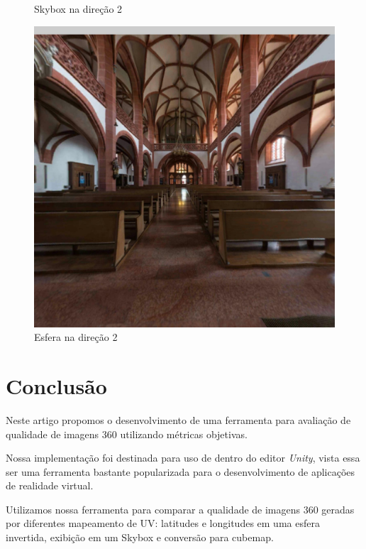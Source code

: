\documentclass[conference]{IEEEtran}
\begin{document}
\begin{figure}[!tbp]
\begin{minipage}[b]{0.3\textwidth}
    \caption{Skybox na direção 2}
    \label{fig:equisphere}
  \end{minipage}
  \hfill
  \begin{minipage}[b]{0.3\textwidth}
    \centering
    \includegraphics[width=1.1\textwidth]{../images/screenshots/Screenshot_5_Sphere}
    \caption{Esfera na direção 2}
    \label{fig:equisphere}
  \end{minipage}
\end{figure}

\section{Conclusão}  \label{sec:conclusion}

Neste artigo propomos o desenvolvimento de uma ferramenta para avaliação de qualidade de imagens 360 utilizando métricas objetivas.

Nossa implementação foi destinada para uso de dentro do editor \textit{Unity}, vista essa ser uma ferramenta bastante popularizada para o desenvolvimento de aplicações de realidade virtual.

Utilizamos nossa ferramenta para comparar a qualidade de imagens 360 geradas por diferentes mapeamento de UV: latitudes e longitudes em uma esfera invertida, exibição em um Skybox e conversão para cubemap.
\end{document}
